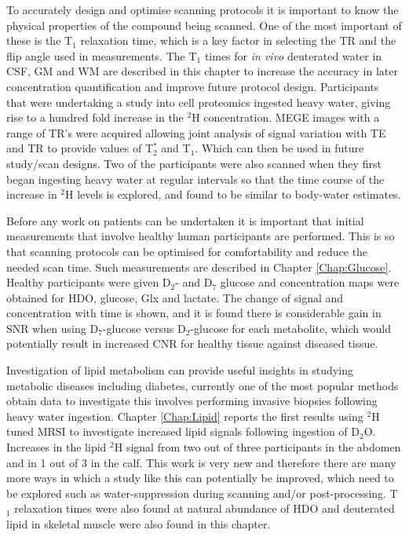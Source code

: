 To accurately design and optimise scanning protocols it is important to know the physical properties of the compound being scanned. One of the most important of these is the T$_1$ relaxation time, which is a key factor in selecting the \ac{TR} and the flip angle used in measurements. The T$_1$ times for \textit{in vivo} deuterated water in \ac{CSF}, \ac{GM} and \ac{WM} are described in this chapter to increase the accuracy in later concentration quantification and improve future protocol design. Participants that were undertaking a study into cell proteomics ingested heavy water, giving rise to a hundred fold increase in the $^2$H concentration. \ac{MEGE} images with a range of \ac{TR}'s were acquired allowing joint analysis of signal variation with \ac{TE} and \ac{TR} to provide values of T$_2^*$ and T$_1$. Which can then be used in future study/scan designs. Two of the participants were also scanned when they first began ingesting heavy water at regular intervals so that the time course of the increase in $^2$H levels is explored, and found to be similar to body-water estimates.

Before any work on patients can be undertaken it is important that initial measurements that involve healthy human participants are performed. This is so that scanning protocols can be optimised for comfortability and reduce the needed scan time. Such measurements are described in Chapter \ref{Chap:Glucose}. Healthy participants were given D$_2$- and D$_7$ glucose and concentration maps were obtained for \ac{HDO}, glucose, Glx and lactate. The change of signal and concentration with time is shown, and it is found there is considerable gain in \ac{SNR} when using D$_7$-glucose versus D$_2$-glucose for each metabolite, which would potentially result in increased \ac{CNR} for healthy tissue against diseased tissue.

Investigation of lipid metabolism can provide useful insights in studying metabolic diseases including diabetes, currently one of the most popular methods obtain data to investigate this involves performing invasive biopsies following heavy water ingestion. Chapter \ref{Chap:Lipid} reports the first results using $^2$H tuned MRSI to investigate increased lipid signals following ingestion of D$_2$O. Increases in the lipid $^2$H signal from two out of three participants in the abdomen and in 1 out of 3 in the calf. This work is very new and therefore there are many more ways in which a study like this can potentially be improved, which need to be explored such as water-suppression during scanning and/or post-processing. T$_1$ relaxation times were also found at natural abundance of \ac{HDO} and deuterated lipid in skeletal muscle were also found in this chapter.

